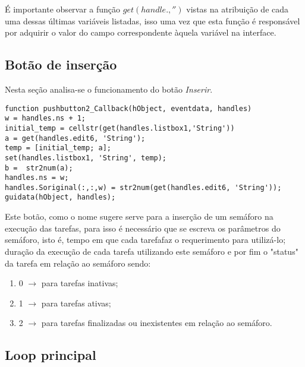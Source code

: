 É importante observar a função $get(handle. , '')$ vistas na atribuição de cada uma dessas últimas variáveis listadas, isso uma vez que esta função é responsável por adquirir o valor do campo correspondente àquela variável na interface.


\subsection{Botão de inserção}

Nesta seção analisa-se o funcionamento do botão \textit{Inserir}. 

\begin{lstlisting}
function pushbutton2_Callback(hObject, eventdata, handles)
w = handles.ns + 1;
initial_temp = cellstr(get(handles.listbox1,'String'))
a = get(handles.edit6, 'String');
temp = [initial_temp; a];
set(handles.listbox1, 'String', temp);
b =  str2num(a);
handles.ns = w;
handles.Soriginal(:,:,w) = str2num(get(handles.edit6, 'String'));
guidata(hObject, handles);

\end{lstlisting}

Este botão, como o nome sugere serve para a inserção de um semáforo na execução das tarefas, para isso é necessário que se escreva os parâmetros do semáforo, isto é, tempo em que cada tarefafaz o requerimento para utilizá-lo; duração da execução de cada tarefa utilizando este semáforo e por fim o "status" da tarefa em relação ao semáforo sendo:

\begin{enumerate}
\item 0 $\rightarrow$ para tarefas inativas;
\item 1 $\rightarrow$ para tarefas ativas;
\item 2 $\rightarrow$ para tarefas finalizadas ou inexistentes em relação ao semáforo.
\end{enumerate}

\subsection{Loop principal}


